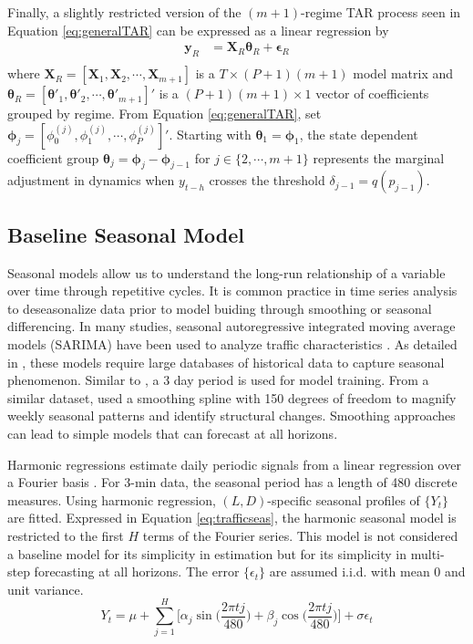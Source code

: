 Finally, a slightly restricted version of the $(m+1)$-regime TAR process seen in Equation \ref{eq:generalTAR} can be expressed as a linear regression by
\begin{equation}
\label{eq:hdlinmod}
\begin{split}
\bm{y}_R &=\bm{X}_R\bm{\theta}_R+\bm{\epsilon}_R \\
\end{split}
\end{equation}
where $\bm{X}_R=[\bm{X}_1,\bm{X}_2,\cdots,\bm{X}_{m+1}]$ is a $T\times (P+1)(m+1)$ model matrix and $\bm{\theta}_R=[\bm{\theta}'_{1},\bm{\theta}'_2,\cdots,\bm{\theta}'_{m+1}]'$ is a $(P+1)(m+1) \times 1$ vector of coefficients grouped by regime. From Equation \ref{eq:generalTAR}, set $\bm{\phi}_j=[\phi^{(j)}_0,\phi^{(j)}_1,\cdots,\phi^{(j)}_P]'$. Starting with $\bm{\theta}_1=\bm{\phi}_1$, the state dependent coefficient group $\bm{\theta}_j=\bm{\phi}_{j}-\bm{\phi}_{j-1}$ for $j \in \{2,\cdots,m+1\}$ represents the marginal adjustment in dynamics when $y_{t-h}$ crosses the threshold $\delta_{j-1}=q(p_{j-1})$.

\subsection{Baseline Seasonal Model}
Seasonal models allow us to understand the long-run relationship of a variable over time through repetitive cycles. It is common practice in time series analysis to deseasonalize data prior to model buiding through smoothing or seasonal differencing. In many studies, seasonal autoregressive integrated moving average models (SARIMA) have been used to analyze traffic characteristics \citep{Williams2003, Ghosh2005, Zhang2011}. As detailed in \cite{Kumar2015}, these models require large databases of historical data to capture seasonal phenomenon. Similar to \cite{Kumar2015}, a 3 day period is used for model training. From a similar dataset, \cite{Kamarianakis2010} used a smoothing spline with 150 degrees of freedom to magnify weekly seasonal patterns and identify structural changes. Smoothing approaches can lead to simple models that can forecast at all horizons.

Harmonic regressions estimate daily periodic signals from a linear regression over a Fourier basis \citep{Metcalfe2009}. For 3-min data, the seasonal period has a length of 480 discrete measures. Using harmonic regression, $(L,D)$-specific seasonal profiles of $\{Y_t\}$ are fitted. Expressed in Equation \ref{eq:trafficseas}, the harmonic seasonal model is restricted to the first $H$ terms of the Fourier series.  This model is not considered a baseline model for its simplicity in estimation but for its simplicity in multi-step forecasting at all horizons. The error $\{\epsilon_t\}$ are assumed i.i.d. with mean 0 and unit variance.
\begin{equation}
\label{eq:trafficseas}
Y_{t}=\mu+\sum\limits_{j=1}^{H} \Big[\alpha_{j}\sin\Big(\frac{2\pi tj}{480}\Big)+\beta_{j}\cos\Big(\frac{2\pi tj}{480}\Big)\Big]+\sigma\epsilon_{t}
\end{equation}

